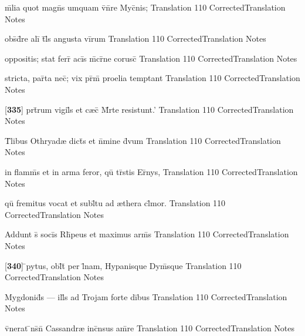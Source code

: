 \latline
  {m\={\macron {\i}}lia quot magn\={\macron {\i}}s umquam v\={}n\={}re Myc\={}nis;}
  { Translation }
  {110}
  { CorrectedTranslation }
  { Notes }


\latline
  {obs\={}d\={}re ali\={\macron {\i}} t\={}l\={\macron {\i}}s angusta vi\={}rum}
  { Translation }
  {110}
  { CorrectedTranslation }
  { Notes }


\latline
  {oppositis; stat ferr\={\macron {\i}} aci\={}s m\={}cr\={}ne corusc\={}}
  { Translation }
  {110}
  { CorrectedTranslation }
  { Notes }


\latline
  {stricta, par\={}ta nec\={\macron {\i}}; vix pr\={\macron {\i}}m\={\macron {\i}} proelia temptant}
  { Translation }
  {110}
  { CorrectedTranslation }
  { Notes }


\latline
  {[\textbf{335}] prt\={}rum vigil\={}s et c{\ae}c\={} M\={}rte resistunt.'}
  { Translation }
  {110}
  { CorrectedTranslation }
  { Notes }


\latline
  {T\={}libus Othryad{\ae} dict\={\macron {\i}}s et n\={}mine d\={\macron {\i}}vum}
  { Translation }
  {110}
  { CorrectedTranslation }
  { Notes }


\latline
  {in flamm\={}s et in arma feror, qu\={} tr\={\macron {\i}}stis Er\={\macron {\i}}nys,}
  { Translation }
  {110}
  { CorrectedTranslation }
  { Notes }


\latline
  {qu\={} fremitus vocat et subl\={}tu ad {\ae}thera cl\={}mor.}
  { Translation }
  {110}
  { CorrectedTranslation }
  { Notes }


\latline
  {Addunt s\={} soci\={}s Rh\={\macron {\i}}peus et maximus arm\={\macron {\i}}s}
  { Translation }
  {110}
  { CorrectedTranslation }
  { Notes }


\latline
  {[\textbf{340}] \={}pytus, obl\={}t\={\macron {\i}} per l\={}nam, Hypanisque Dym\={}sque}
  { Translation }
  {110}
  { CorrectedTranslation }
  { Notes }


\latline
  {Mygdonid\={}s --- ill\={\macron {\i}}s ad Trojam forte di\={}bus}
  { Translation }
  {110}
  { CorrectedTranslation }
  { Notes }


\latline
  {v\={}nerat \={\macron {\i}}ns\={}n\={} Cassandr{\ae} inc\={}nsus am\={}re}
  { Translation }
  {110}
  { CorrectedTranslation }
  { Notes }


